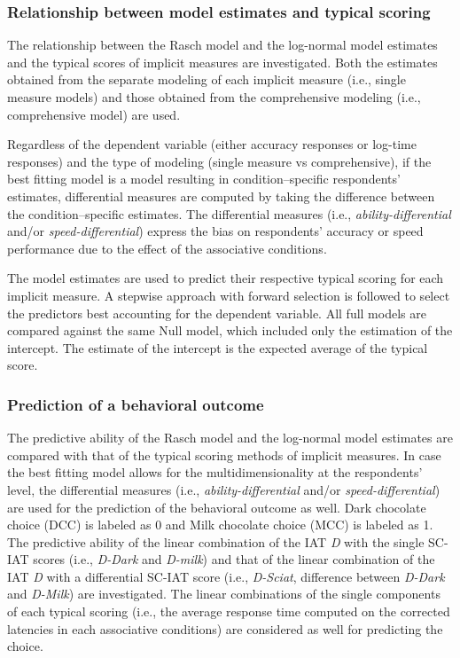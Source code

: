 \documentclass[12pt]{book}
\begin{document}
\subsubsection{Relationship between model estimates and typical scoring}

The relationship between the Rasch model and the log-normal model estimates and the typical scores of implicit measures are investigated. 
Both the estimates obtained from the separate modeling of each implicit measure (i.e., single measure models) and those obtained from the comprehensive modeling (i.e., comprehensive model) are used. 

Regardless of the dependent variable (either accuracy responses or log-time responses) and the type of modeling (single measure vs comprehensive), if the best fitting model is a model resulting in condition--specific respondents' estimates, differential measures are computed by taking the difference between the condition--specific estimates. 
The differential measures (i.e., \emph{ability-differential} and/or \emph{speed-differential}) express the bias on respondents' accuracy or speed performance due to the effect of the associative conditions. 

The model estimates are used to predict their respective typical scoring for each implicit measure. 
A stepwise approach with forward selection is followed to select the predictors best accounting for the dependent variable. 
All full models are compared against the same Null model, which included only the estimation of the intercept. The estimate of the intercept is the expected average of the typical score.

\subsubsection{Prediction of a behavioral outcome}

The predictive ability of the Rasch model and the log-normal model estimates are compared with that of the typical scoring methods of implicit measures. 
In case the best fitting model allows for the multidimensionality at the respondents' level, the differential measures (i.e., \emph{ability-differential} and/or \emph{speed-differential}) are used for the prediction of the behavioral outcome as well.
Dark chocolate choice (DCC) is labeled as 0 and Milk chocolate choice (MCC) is labeled as 1.
The predictive ability of the linear combination of the IAT \emph{D} with the single SC-IAT scores (i.e., \emph{D-Dark} and \emph{D-milk}) and that of the linear combination of the IAT \emph{D} with a differential SC-IAT score (i.e., \emph{D-Sciat}, difference between \emph{D-Dark} and \emph{D-Milk}) are investigated.
The linear combinations of the single components of each typical scoring (i.e., the average response time computed on the corrected latencies in each associative conditions) are considered as well for predicting the choice. 
\end{document}

